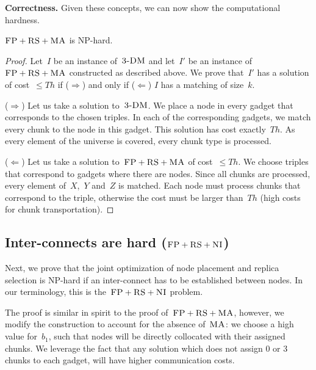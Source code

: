 \documentclass[preprint,12pt]{elsarticle}
\newcommand{\CC}{\textsc{NI}}
\newcommand{\FP}{\textsc{FP}}
\newcommand{\RS}{\textsc{RS}}
\newcommand{\MA}{\textsc{MA}}
\newcommand{\CostTrans}{\ensuremath{b_1}}
\newcommand{\TDM}{\textsc{3-DM}}
\newcommand{\Thr}{\ensuremath{Th}}
\begin{document}
\textbf{Correctness.}
Given these concepts, we can now show the computational hardness.
\begin{theorem}
$\FP+\RS+\MA$ is NP-hard.
\end{theorem}
\begin{proof}
Let~$I$ be an instance of~$\TDM$ and let~$I'$ be an instance of
$\FP+\RS+\MA$ constructed as described above. We prove that~$I'$ has a solution of cost~$\leq \Thr$ if ($\Rightarrow$) and only if
($\Leftarrow$)
$I$ has a matching of size~$k$.

($\Rightarrow$) Let us take a solution to~$\TDM$. We place a node in every
gadget that corresponds to the chosen triples. In each of the corresponding
gadgets, we match every chunk to the node in this gadget. This
solution has
cost exactly~$\Thr$. As every element of the universe is covered, every
chunk type is processed.

($\Leftarrow$) Let us take a solution to~$\FP+\RS+\MA$ of cost~$\leq \Thr$. We
choose triples that correspond to gadgets where there are nodes. Since
all chunks are processed, every element of~$X$,~$Y$ and~$Z$ is matched. Each
node must process chunks that
correspond to the triple, otherwise the
cost must be larger than~$\Thr$ (high costs for chunk
transportation).
\end{proof}


\subsection{Inter-connects are hard ($\FP+\RS+\CC$)}\label{ssec:fprscc}


Next, we prove that the joint optimization of node placement and replica selection
is NP-hard if an inter-connect has to be established between nodes.
In our terminology, this is the~$\FP+\RS+\CC$ problem.

The proof is similar in spirit to the proof of~$\FP+\RS+\MA$, however,
we modify the construction to account for the absence of~$\MA$:
we choose
a high value for~$\CostTrans$, such that nodes will be directly collocated with
their assigned chunks. We leverage the fact that any solution which does not
assign 0 or 3 chunks to each gadget, will have higher communication costs.
\end{document}
